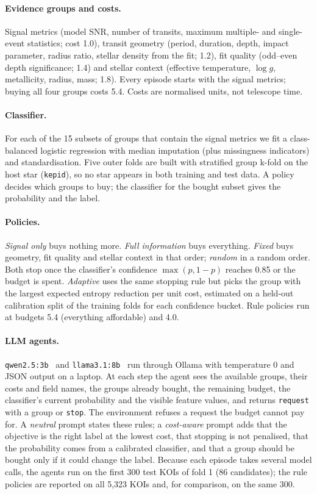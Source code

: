 \documentclass[11pt,a4paper]{article}
\newcommand{\code}[1]{\texttt{#1}}
\begin{document}
\paragraph{Evidence groups and costs.} Signal metrics (model SNR, number of transits, maximum multiple- and
single-event statistics; cost 1.0), transit geometry (period, duration, depth, impact parameter, radius ratio, stellar
density from the fit; 1.2), fit quality (odd--even depth significance; 1.4) and stellar context (effective
temperature, $\log g$, metallicity, radius, mass; 1.8). Every episode starts with the signal metrics; buying all four
groups costs 5.4. Costs are normalised units, not telescope time.

\paragraph{Classifier.} For each of the 15 subsets of groups that contain the signal metrics we fit a
class-balanced logistic regression with median imputation (plus missingness indicators) and standardisation. Five
outer folds are built with stratified group k-fold on the host star (\code{kepid}), so no star appears in both
training and test data. A policy decides which groups to buy; the classifier for the bought subset gives the
probability and the label.

\paragraph{Policies.} \emph{Signal only} buys nothing more. \emph{Full information} buys everything. \emph{Fixed}
buys geometry, fit quality and stellar context in that order; \emph{random} in a random order. Both stop once the
classifier's confidence $\max(p, 1-p)$ reaches 0.85 or the budget is spent. \emph{Adaptive} uses the same stopping
rule but picks the group with the largest expected entropy reduction per unit cost, estimated on a held-out
calibration split of the training folds for each confidence bucket. Rule policies run at budgets 5.4 (everything
affordable) and 4.0.

\paragraph{LLM agents.} \code{qwen2.5:3b}~\cite{qwen2025qwen25} and \code{llama3.1:8b}~\cite{grattafiori2024llama3}
run through Ollama with temperature 0 and JSON output on a laptop. At each step the agent sees the available groups,
their costs and field names, the groups already bought, the remaining budget, the classifier's current probability
and the visible feature values, and returns \code{request} with a group or \code{stop}. The environment refuses a
request the budget cannot pay for. A \emph{neutral} prompt states these rules; a \emph{cost-aware} prompt adds that
the objective is the right label at the lowest cost, that stopping is not penalised, that the probability comes from
a calibrated classifier, and that a group should be bought only if it could change the label. Because each episode
takes several model calls, the agents run on the first 300 test KOIs of fold 1 (86 candidates); the rule policies are
reported on all 5,323 KOIs and, for comparison, on the same 300.
\end{document}
